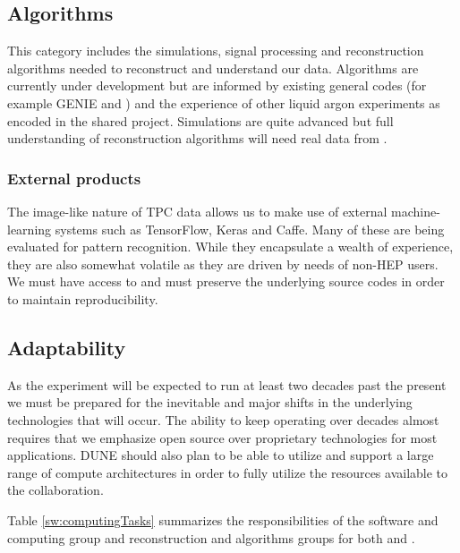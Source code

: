 \subsection{Algorithms}
This category includes the simulations, signal processing and reconstruction algorithms needed to reconstruct and understand our data. Algorithms are currently under development but are  informed by existing general codes (for example GENIE and ) and the experience of other liquid argon experiments as encoded in the shared   project.  Simulations are quite advanced but full understanding of reconstruction algorithms will need real data from . 

\subsubsection{External products}
The image-like nature of TPC data allows us to make use of external machine-learning systems such as TensorFlow\cite{DBLP:journals/corr/AbadiABBCCCDDDG16}, 
Keras\cite{chollet2015keras} and Caffe\cite{Jia:2014:CCA:2647868.2654889}.  Many of these are being evaluated for pattern recognition. While they encapsulate a wealth of experience, they are also somewhat volatile as they are driven by needs of non-HEP users.  We must have access to and must preserve the underlying source codes in order to maintain reproducibility. 



\subsection{Adaptability}
As the experiment will be expected to run at least two decades past the present we must be prepared for the inevitable and major shifts in the underlying technologies that will occur. The ability to keep operating over decades almost requires that we emphasize open source over proprietary technologies for most applications.  DUNE should also plan to be able to utilize and support a large range of compute architectures in order to fully utilize the resources available to the collaboration.


Table \ref{sw:computingTasks} summarizes the responsibilities of the software and computing group and reconstruction and algorithms groups for both  and .

